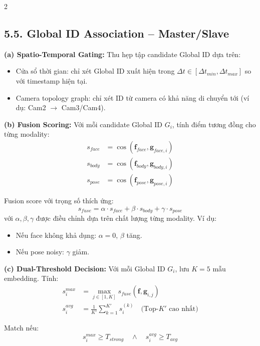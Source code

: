 \documentclass[a4paper,13pt]{article}
\begin{document}
\begin{multicols}{2}
\subsection*{5.5. Global ID Association -- Master/Slave}

\textbf{(a) Spatio-Temporal Gating:}
Thu hẹp tập candidate Global ID dựa trên:
\begin{itemize}
    \item Cửa sổ thời gian: chỉ xét Global ID xuất hiện trong $\Delta t \in [\Delta t_{min}, \Delta t_{max}]$ so với timestamp hiện tại.
    \item Camera topology graph: chỉ xét ID từ camera có khả năng di chuyển tới (ví dụ: Cam2 $\to$ Cam3/Cam4).
\end{itemize}

\textbf{(b) Fusion Scoring:}
Với mỗi candidate Global ID $G_i$, tính điểm tương đồng cho từng modality:
\begin{align}
s_{face} &= \cos(\mathbf{f}_{face}, \mathbf{g}_{face,i}) \\
s_{body} &= \cos(\mathbf{f}_{body}, \mathbf{g}_{body,i}) \\
s_{pose} &= \cos(\mathbf{f}_{pose}, \mathbf{g}_{pose,i})
\end{align}

Fusion score với trọng số thích ứng:
\begin{equation}
s_{fuse} = \alpha \cdot s_{face} + \beta \cdot s_{body} + \gamma \cdot s_{pose}
\label{eq:fusion}
\end{equation}
với $\alpha, \beta, \gamma$ được điều chỉnh dựa trên chất lượng từng modality. Ví dụ:
\begin{itemize}
    \item Nếu face không khả dụng: $\alpha=0$, $\beta$ tăng.
    \item Nếu pose noisy: $\gamma$ giảm.
\end{itemize}

\textbf{(c) Dual-Threshold Decision:}
Với mỗi Global ID $G_i$, lưu $K=5$ mẫu embedding. Tính:
\begin{align}
s^{max}_i &= \max_{j \in [1,K]} s_{fuse}(\mathbf{f}, \mathbf{g}_{i,j}) \\
s^{avg}_i &= \frac{1}{K'} \sum_{k=1}^{K'} s^{(k)}_i \quad \text{(Top-$K'$ cao nhất)}
\end{align}

Match nếu:
\begin{equation}
s^{max}_i \geq T_{strong} \quad \wedge \quad s^{avg}_i \geq T_{avg}
\label{eq:dual_threshold}
\end{equation}


\end{multicols}
\end{document}
